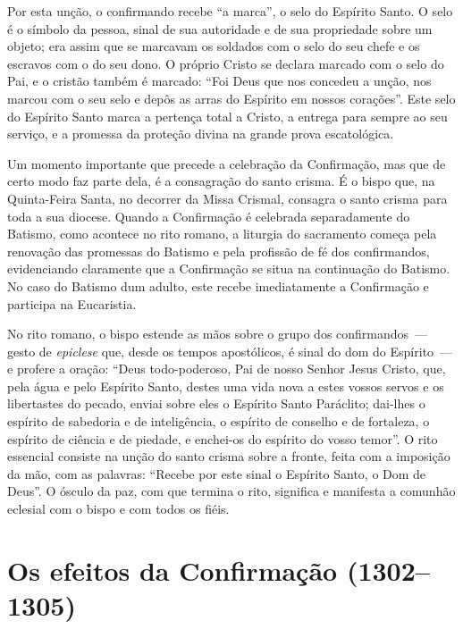 Por esta unção, o confirmando recebe ``a marca'', o selo do Espírito Santo. O selo é o símbolo da pessoa, sinal de sua autoridade e de sua propriedade sobre um objeto; era assim que se marcavam os soldados com o selo do seu chefe e os escravos com o do seu dono. O próprio Cristo se declara marcado com o selo do Pai, e o cristão também é marcado: ``Foi Deus que nos concedeu a unção, nos marcou com o seu selo e depôs as arras do Espírito em nossos corações''. Este selo do Espírito Santo marca a pertença total a Cristo, a entrega para sempre ao seu serviço, e a promessa da proteção divina na grande prova escatológica.

Um momento importante que precede a celebração da Confirmação, mas que de certo modo faz parte dela, é a consagração do santo crisma. É o bispo que, na Quinta-Feira Santa, no decorrer da Missa Crismal, consagra o santo crisma para toda a sua diocese. Quando a Confirmação é celebrada separadamente do Batismo, como acontece no rito romano, a liturgia do sacramento começa pela renovação das promessas do Batismo e pela profissão de fé dos confirmandos, evidenciando claramente que a Confirmação se situa na continuação do Batismo. No caso do Batismo dum adulto, este recebe imediatamente a Confirmação e participa na Eucaristia.

No rito romano, o bispo estende as mãos sobre o grupo dos confirmandos~--- gesto de \emph{epiclese} que, desde os tempos apostólicos, é sinal do dom do Espírito~--- e profere a oração: ``Deus todo-poderoso, Pai de nosso Senhor Jesus Cristo, que, pela água e pelo Espírito Santo, destes uma vida nova a estes vossos servos e os libertastes do pecado, enviai sobre eles o Espírito Santo Paráclito; dai-lhes o espírito de sabedoria e de inteligência, o espírito de conselho e de fortaleza, o espírito de ciência e de piedade, e enchei-os do espírito do vosso temor''. O rito essencial consiste na unção do santo crisma sobre a fronte, feita com a imposição da mão, com as palavras: ``Recebe por este sinal o Espírito Santo, o Dom de Deus''. O ósculo da paz, com que termina o rito, significa e manifesta a comunhão eclesial com o bispo e com todos os fiéis.

\section{Os efeitos da Confirmação (1302--1305)}

